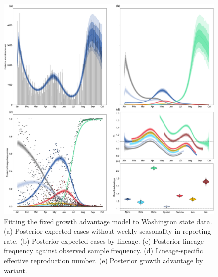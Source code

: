 \documentclass[11pt,oneside,letterpaper]{article}
\begin{document}
\begin{figure}
  \centering
  \includegraphics[width=\linewidth]{figs/fig_2_Washington.png}
  \caption{Fitting the fixed growth advantage model to Washington state data.
  (a) Posterior expected cases without weekly seasonality in reporting rate.
  (b) Posterior expected cases by lineage.
  (c) Posterior lineage frequency against observed sample frequency.
  (d) Lineage-specific effective reproduction number.
  (e) Posterior growth advantage by variant.}%
  \label{fig:2}
\end{figure}
\end{document}
